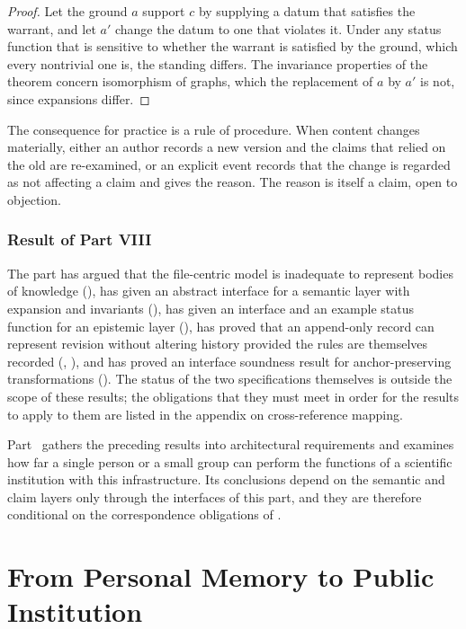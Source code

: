 \documentclass[11pt,twoside,openright]{book}
\theoremstyle{plain}
\theoremstyle{definition}
\theoremstyle{remark}
\begin{document}
\begin{proof}
Let the ground $a$ support $c$ by supplying a datum that satisfies the warrant, and let $a'$ change the datum to one that violates it. Under any status function that is sensitive to whether the warrant is satisfied by the ground, which every nontrivial one is, the standing differs. The invariance properties of the theorem concern isomorphism of graphs, which the replacement of $a$ by $a'$ is not, since expansions differ.
\end{proof}

The consequence for practice is a rule of procedure. When content changes materially, either an author records a new version and the claims that relied on the old are re-examined, or an explicit event records that the change is regarded as not affecting a claim and gives the reason. The reason is itself a claim, open to objection.

\section{Result of Part VIII}

The part has argued that the file-centric model is inadequate to represent bodies of knowledge (), has given an abstract interface for a semantic layer with expansion and invariants (), has given an interface and an example status function for an epistemic layer (), has proved that an append-only record can represent revision without altering history provided the rules are themselves recorded (, ), and has proved an interface soundness result for anchor-preserving transformations (). The status of the two specifications themselves is outside the scope of these results; the obligations that they must meet in order for the results to apply to them are listed in the appendix on cross-reference mapping.

Part~\ref{part:institution} gathers the preceding results into architectural requirements and examines how far a single person or a small group can perform the functions of a scientific institution with this infrastructure. Its conclusions depend on the semantic and claim layers only through the interfaces of this part, and they are therefore conditional on the correspondence obligations of .

\part{From Personal Memory to Public Institution}\label{part:institution}
\end{document}
